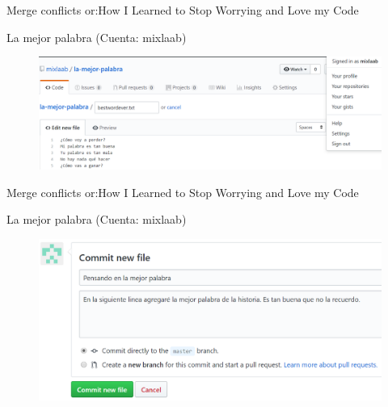\documentclass[10pt]{beamer}
\begin{document}
\begin{frame}{Merge conflicts or:}{How I Learned to Stop Worrying and Love my Code \heartsuit}

\begin{block}{La mejor palabra (Cuenta: mixlaab)}

\begin{figure}[h!]
\centering
\includegraphics [scale=0.25]{bestwordever}
\label{fig:issues}
\end{figure}
    
\end{block}

\end{frame}

\begin{frame}{Merge conflicts or:}{How I Learned to Stop Worrying and Love my Code \heartsuit}

\begin{block}{La mejor palabra (Cuenta: mixlaab)}

\begin{figure}[h!]
\centering
\includegraphics [scale=0.3]{bestwordever2}
\label{fig:issues}
\end{figure}
    
\end{block}

\end{frame}
\end{document}

